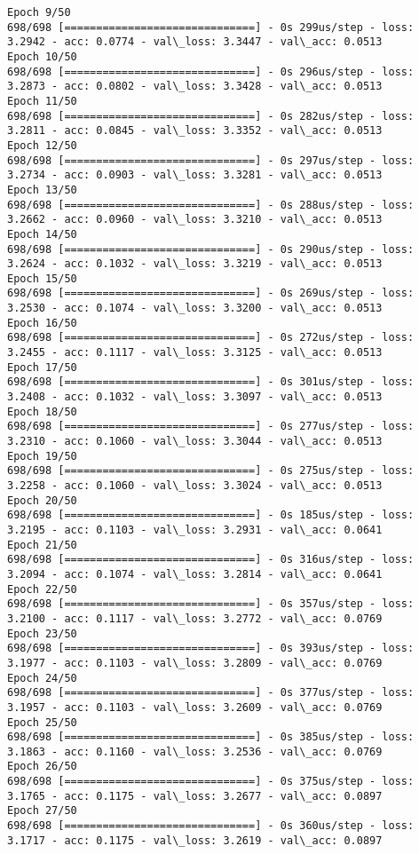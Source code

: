 \documentclass[11pt]{article}
\begin{document}
\begin{Verbatim}[commandchars=\\\{\}]
Epoch 9/50
698/698 [==============================] - 0s 299us/step - loss: 3.2942 - acc: 0.0774 - val\_loss: 3.3447 - val\_acc: 0.0513
Epoch 10/50
698/698 [==============================] - 0s 296us/step - loss: 3.2873 - acc: 0.0802 - val\_loss: 3.3428 - val\_acc: 0.0513
Epoch 11/50
698/698 [==============================] - 0s 282us/step - loss: 3.2811 - acc: 0.0845 - val\_loss: 3.3352 - val\_acc: 0.0513
Epoch 12/50
698/698 [==============================] - 0s 297us/step - loss: 3.2734 - acc: 0.0903 - val\_loss: 3.3281 - val\_acc: 0.0513
Epoch 13/50
698/698 [==============================] - 0s 288us/step - loss: 3.2662 - acc: 0.0960 - val\_loss: 3.3210 - val\_acc: 0.0513
Epoch 14/50
698/698 [==============================] - 0s 290us/step - loss: 3.2624 - acc: 0.1032 - val\_loss: 3.3219 - val\_acc: 0.0513
Epoch 15/50
698/698 [==============================] - 0s 269us/step - loss: 3.2530 - acc: 0.1074 - val\_loss: 3.3200 - val\_acc: 0.0513
Epoch 16/50
698/698 [==============================] - 0s 272us/step - loss: 3.2455 - acc: 0.1117 - val\_loss: 3.3125 - val\_acc: 0.0513
Epoch 17/50
698/698 [==============================] - 0s 301us/step - loss: 3.2408 - acc: 0.1032 - val\_loss: 3.3097 - val\_acc: 0.0513
Epoch 18/50
698/698 [==============================] - 0s 277us/step - loss: 3.2310 - acc: 0.1060 - val\_loss: 3.3044 - val\_acc: 0.0513
Epoch 19/50
698/698 [==============================] - 0s 275us/step - loss: 3.2258 - acc: 0.1060 - val\_loss: 3.3024 - val\_acc: 0.0513
Epoch 20/50
698/698 [==============================] - 0s 185us/step - loss: 3.2195 - acc: 0.1103 - val\_loss: 3.2931 - val\_acc: 0.0641
Epoch 21/50
698/698 [==============================] - 0s 316us/step - loss: 3.2094 - acc: 0.1074 - val\_loss: 3.2814 - val\_acc: 0.0641
Epoch 22/50
698/698 [==============================] - 0s 357us/step - loss: 3.2100 - acc: 0.1117 - val\_loss: 3.2772 - val\_acc: 0.0769
Epoch 23/50
698/698 [==============================] - 0s 393us/step - loss: 3.1977 - acc: 0.1103 - val\_loss: 3.2809 - val\_acc: 0.0769
Epoch 24/50
698/698 [==============================] - 0s 377us/step - loss: 3.1957 - acc: 0.1103 - val\_loss: 3.2609 - val\_acc: 0.0769
Epoch 25/50
698/698 [==============================] - 0s 385us/step - loss: 3.1863 - acc: 0.1160 - val\_loss: 3.2536 - val\_acc: 0.0769
Epoch 26/50
698/698 [==============================] - 0s 375us/step - loss: 3.1765 - acc: 0.1175 - val\_loss: 3.2677 - val\_acc: 0.0897
Epoch 27/50
698/698 [==============================] - 0s 360us/step - loss: 3.1717 - acc: 0.1175 - val\_loss: 3.2619 - val\_acc: 0.0897

\end{Verbatim}
\end{document}
